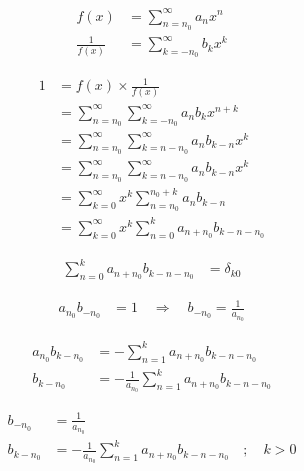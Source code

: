 \documentclass[a4paper,10pt,fleqn]{scrartcl}
\begin{document}
    \begin{align*}
        f(x) &= \sum\limits_{n=n_0}^\infty a_n x^n \\
        \frac1{f(x)} &= \sum\limits_{k=-n_0}^\infty b_k x^k
    \end{align*}

    \begin{align*}
        1
        &=
        f(x) \times \frac1{f(x)}
        \\
        &=
        \sum\limits_{n=n_0}^\infty
        \sum\limits_{k=-n_0}^\infty
        a_n
        b_k
        x^{n+k}
        \\
        &=
        \sum\limits_{n=n_0}^\infty
        \sum\limits_{k=n-n_0}^\infty
        a_n
        b_{k-n}
        x^k
        \\
        &=
        \sum\limits_{n=n_0}^\infty
        \sum\limits_{k=n-n_0}^\infty
        a_n
        b_{k-n}
        x^k
        \\
        &=
        \sum\limits_{k=0}^\infty
        x^k
        \sum\limits_{n=n_0}^{n_0+k}
        a_n
        b_{k-n}
        \\
        &=
        \sum\limits_{k=0}^\infty
        x^k
        \sum\limits_{n=0}^{k}
        a_{n+n_0}
        b_{k-n-n_0}
    \end{align*}

    \begin{align*}
        \sum\limits_{n=0}^{k}
        a_{n+n_0}
        b_{k-n-n_0}
        &=
        \delta_{k0}
    \end{align*}

    \begin{align*}
        a_{n_0}
        b_{-n_0}
        &=
        1
        \quad\Rightarrow\quad
        b_{-n_0} = \frac1{a_{n_0}}
    \end{align*}

    \begin{align*}
        a_{n_0}
        b_{k-n_0}
        &=
        -
        \sum\limits_{n=1}^{k}
        a_{n+n_0}
        b_{k-n-n_0}
        \\
        b_{k-n_0}
        &=
        -
        \frac1{a_{n_0}}
        \sum\limits_{n=1}^{k}
        a_{n+n_0}
        b_{k-n-n_0}
    \end{align*}

    \begin{align*}
        b_{-n_0} &= \frac1{a_{n_0}} \\
        b_{k-n_0}
        &=
        -
        \frac1{a_{n_0}}
        \sum\limits_{n=1}^{k}
        a_{n+n_0}
        b_{k-n-n_0}
        \quad;\quad k>0
    \end{align*}
\end{document}
